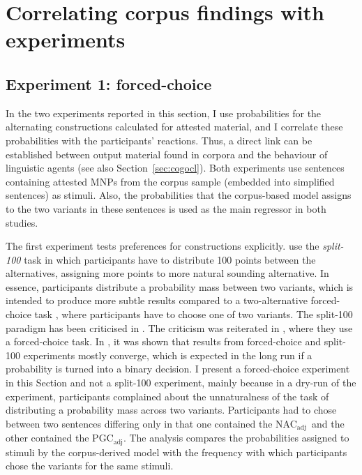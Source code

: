 \documentclass[USenglish]{article}
\newcommand{\Sub}[1]{\ensuremath{\mathrm{_{#1}}}}
\newcommand{\NACa}{NAC\Sub{adj}}
\newcommand{\PGCa}{PGC\Sub{adj}}
\begin{document}


\section{Correlating corpus findings with experiments}
\label{sec:experimental}

\subsection{Experiment 1: forced-choice}
\label{sec:exp:fc}

In the two experiments reported in this section, I use probabilities for the alternating constructions calculated for attested material, and I correlate these probabilities with the participants' reactions.
Thus, a direct link can be established between output material found in corpora and the behaviour of linguistic agents (see also Section~\ref{sec:cogocl}).
Both experiments use sentences containing attested MNPs from the corpus sample (embedded into simplified sentences) as stimuli.
Also, the probabilities that the corpus-based model assigns to the two variants in these sentences is used as the main regressor in both studies.

The first experiment tests preferences for constructions explicitly.
\cite{FordBresnan2013} use the \textit{split-100} task in which participants have to distribute 100 points between the alternatives, assigning more points to more natural sounding alternative.
In essence, participants distribute a probability mass between two variants, which is intended to produce more subtle results compared to a two-alternative forced-choice task \citep{Rosenbach2013}, where participants have to choose one of two variants.
The split-100 paradigm has been criticised in \cite{ArppeJaervikivi2007}.
The criticism was reiterated in \cite{DivjakEa2016}, where they use a forced-choice task.
In \cite{VerhoevenTemme2017}, it was shown that results from forced-choice and split-100 experiments mostly converge, which is expected in the long run if a probability is turned into a binary decision.
I present a forced-choice experiment in this Section and not a split-100 experiment, mainly because in a dry-run of the experiment, participants complained about the unnaturalness of the task of distributing a probability mass across two variants.
Participants had to chose between two sentences differing only in that one contained the \NACa\ and the other contained the \PGCa.
The analysis compares the probabilities assigned to stimuli by the corpus-derived model with the frequency with which participants chose the variants for the same stimuli.
\end{document}
